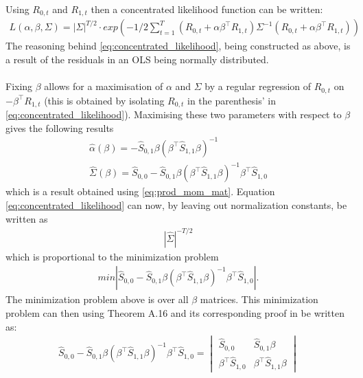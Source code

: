 \begin{bevis}
    Using $R_{0,t}$ and $R_{1,t}$ then a concentrated likelihood function can be written:
    \begin{align}\label{eq:concentrated_likelihood}
        L(\alpha,\beta,\Sigma)=|\Sigma|^{T/2}\cdot exp\left(-1/2\sum_{t=1}^T\left(R_{0,t}+\alpha\beta^{\top} R_{1,t}\right)\Sigma^{-1}\left(R_{0,t}+\alpha\beta^{\top} R_{1,t}\right)\right)
    \end{align}
    The reasoning behind \eqref{eq:concentrated_likelihood}, being constructed as above, is a result of the residuals in an OLS being normally distributed.\\\\
 Fixing $\beta$ allows for a maximisation of $\alpha$ and $\Sigma$ by a regular regression of $R_{0,t}$ on $-\beta^\top R_{1,t}$ (this is obtained by isolating $R_{0,t}$ in the parenthesis' in \eqref{eq:concentrated_likelihood}). Maximising these two parameters with respect to $\beta$ gives the following results
 \begin{align}\label{eq:max_alphaandsigma}
     \hat{\alpha}(\beta)=-\hat{S}_{0,1}\beta(\beta^\top \hat{S}_{1,1}\beta)^{-1}\\
     \hat{\Sigma}(\beta)=\hat{S}_{0,0}-\hat{S}_{0,1}\beta\left(\beta^\top \hat{S}_{1,1}\beta\right)^{-1}\beta^\top \hat{S}_{1,0}
 \end{align}
 which is a result obtained using \eqref{eq:prod_mom_mat}. Equation \eqref{eq:concentrated_likelihood} can now, by leaving out normalization constants, be written as
 \begin{align*}
     |\hat{\Sigma}|^{-T/2}
 \end{align*}
 which is proportional to the minimization problem
 \begin{align}
     min|\hat{S}_{0,0}-\hat{S}_{0,1}\beta\left(\beta^\top \hat{S}_{1,1}\beta\right)^{-1}\beta^\top \hat{S}_{1,0}|.%
 \end{align}
 The minimization problem above is over all $\beta$ matrices. This minimization problem can then using Theorem A.16 and its corresponding proof in \cite{Linear_Models:_Least_Squares_and_Alternatives_Second_Edition} be written as:
 \begin{align*}
     \hat{S}_{0,0}-\hat{S}_{0,1}\beta\left(\beta^\top \hat{S}_{1,1}\beta\right)^{-1}\beta^\top \hat{S}_{1,0}=\begin{vmatrix}
         \hat{S}_{0,0}&\hat{S}_{0,1}\beta\\
         \beta^{\top}\hat{S}_{1,0}&\beta^{\top} \hat{S}_{1,1}\beta\end{vmatrix}\\

\end{align*}
\end{bevis}
